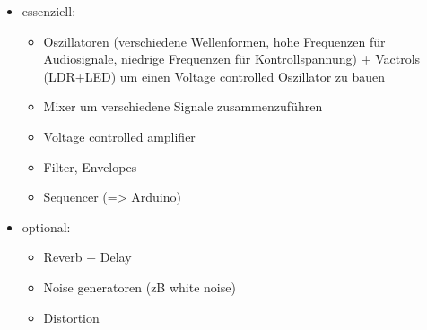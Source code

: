 \documentclass[11pt]{article}
\begin{document}
\begin{itemize}
\item essenziell:
\begin{itemize}
\item Oszillatoren (verschiedene Wellenformen, hohe Frequenzen für Audiosignale, niedrige Frequenzen für Kontrollspannung) + Vactrols (LDR+LED) um einen Voltage controlled Oszillator zu bauen
\item Mixer um verschiedene Signale zusammenzuführen
\item Voltage controlled amplifier
\item Filter, Envelopes
\item Sequencer (=> Arduino)
\end{itemize}
\item optional:
\begin{itemize}
\item Reverb + Delay
\item Noise generatoren (zB white noise)
\item Distortion
\end{itemize}
\end{itemize}
\end{document}
